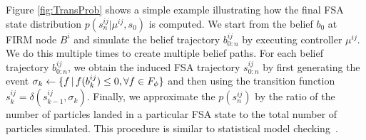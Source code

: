 \documentclass[conference]{IEEEtran}
\newcommand{\sofie}[1]{{\color{purple} [Sofie] #1}}
\begin{document}
Figure \ref{fig:TransProb} shows a simple example illustrating how the final FSA state distribution $p(s^{ij}_n|\mu^{ij},s_0)$ is computed.
We start from the belief $b_0$ at FIRM node $B^i$ and simulate the belief trajectory $b^{ij}_{0:n}$ by executing controller $\mu^{ij}$. We do this multiple times to create multiple belief paths. For each belief trajectory $b^{ij}_{0:n}$, we obtain the induced FSA trajectory $s^{ij}_{0:n}$ by first generating the event $\sigma_k \leftarrow \{ f \,|\, f(b^{ij}_k) \leq 0, \forall f \in F_\phi \}$ and then using the transition function $s^{ij}_{k} = \delta(s^{ij}_{k-1},\sigma_k)$. Finally, we approximate the $p(s^{ij}_n)$ by the ratio of the number of particles landed in a particular FSA state to the total number of particles simulated.
This procedure is similar to statistical model checking~\cite{Legay2010}.







\end{document}
